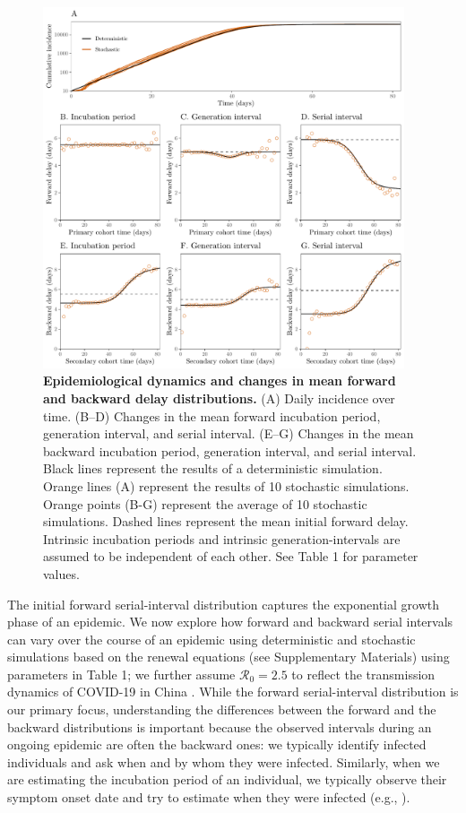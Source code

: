\documentclass[12pt]{article}
\newcommand{\Rx}[1]{\ensuremath{{\mathcal R}_{#1}}\xspace}
\newcommand{\Ro}{\Rx{0}}
\begin{document}
\begin{figure}[!ht]
\begin{center}
\includegraphics[width=0.95\textwidth]{forward.pdf}
\caption{
\textbf{Epidemiological dynamics and changes in mean forward and backward delay distributions.}
(A) Daily incidence over time.
(B--D) Changes in the mean forward incubation period, generation interval, and serial interval.
(E--G) Changes in the mean backward incubation period, generation interval, and serial interval.
Black lines represent the results of a deterministic simulation.
Orange lines (A) represent the results of 10 stochastic simulations.
Orange points (B-G) represent the average of 10 stochastic simulations.
Dashed lines represent the mean initial forward delay.
Intrinsic incubation periods and intrinsic generation-intervals are assumed to be independent of each other.
See Table 1 for parameter values.
}
\label{fig:epi}
\end{center}
\end{figure}

The initial forward serial-interval distribution captures the exponential growth phase of an epidemic.
We now explore how forward and backward serial intervals can vary over the course of an epidemic using deterministic and stochastic simulations based on the renewal equations (see Supplementary Materials) using parameters in Table 1;
we further assume $\Ro=2.5$ to reflect the transmission dynamics of COVID-19 in China \citep{doi:10.1098/rsif.2020.0144}.
While the forward serial-interval distribution is our primary focus, understanding the differences between the forward and the backward distributions is important because the observed intervals during an ongoing epidemic are often the backward ones:
we typically identify infected individuals and ask when and by whom they were infected.
Similarly, when we are estimating the incubation period of an individual, we typically observe their symptom onset date and try to estimate when they were infected (e.g., \cite{backer2020incubation}).
\end{document}
